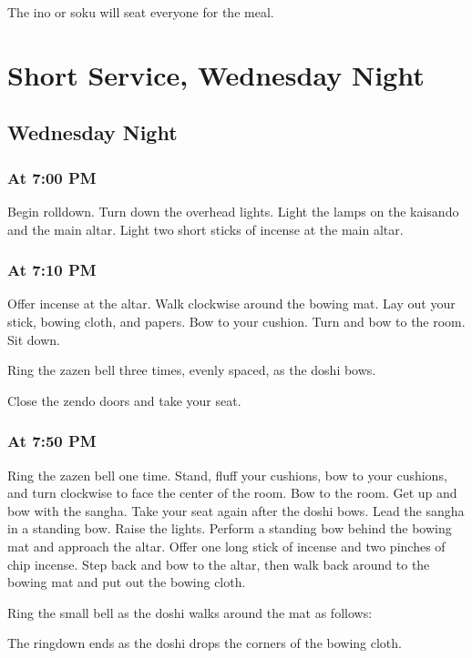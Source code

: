 \documentclass{kdo}
\begin{document}
\begin{services}
The ino or soku will seat everyone for the meal.

\part{Short Service, Wednesday Night}
\chapter{Wednesday Night}
\section*{At 7:00 PM}
\tenken Begin rolldown.
\doan Turn down the overhead lights. Light the lamps on the kaisando and the
main altar. Light two short sticks of incense at the main altar.
\section*{At 7:10 PM}

\doshi Offer incense at the altar. Walk clockwise around the bowing mat. Lay
out your stick, bowing cloth, and papers. Bow to your cushion. Turn and bow to
the room.  Sit down.

\doan Ring the zazen bell three times, evenly spaced, as the doshi bows.
\jundoStartZazen

\tenken Close the zendo doors and take your seat.

\section*{At 7:50 PM}
\doan Ring the zazen bell one time. \bigspace\zazenbell
\sangha Stand, fluff your cushions, bow to your cushions, and turn clockwise to
face the center of the room. Bow to the room.
\doan Get up and bow with the sangha. Take your seat again after the doshi
bows.
\doshi Lead the sangha in a standing bow.
\tenken Raise the lights.
\doshi Perform a standing bow behind the bowing mat and approach the altar.
Offer one long stick of incense and two pinches of chip incense. Step back and
bow to the altar, then walk back around to the bowing mat and put out the
bowing cloth.

\pagebreak

\doan Ring the small bell as the doshi walks around the mat as follows:

\doshiBowingClothRolldown

The ringdown ends as the doshi drops the corners of the bowing cloth.


\end{services}
\end{document}
